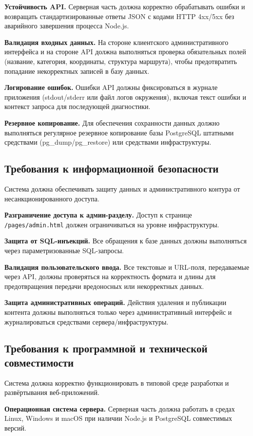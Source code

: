 \textbf{Устойчивость API.} Серверная часть должна корректно обрабатывать
ошибки и возвращать стандартизированные ответы JSON с кодами HTTP 4xx/5xx
без аварийного завершения процесса Node.js.

\textbf{Валидация входных данных.} На стороне клиентского административного
интерфейса и на стороне API должна выполняться проверка обязательных полей
(название, категория, координаты, структура маршрута), чтобы предотвратить
попадание некорректных записей в базу данных.

\textbf{Логирование ошибок.} Ошибки API должны фиксироваться в журнале
приложения (stdout/stderr или файл логов окружения), включая текст ошибки и
контекст запроса для последующей диагностики.

\textbf{Резервное копирование.} Для обеспечения сохранности данных должно
выполняться регулярное резервное копирование базы PostgreSQL штатными
средствами (pg\_dump/pg\_restore) или средствами инфраструктуры.

\subsection{Требования к информационной безопасности}
Система должна обеспечивать защиту данных и административного контура от
несанкционированного доступа.

\textbf{Разграничение доступа к админ-разделу.} Доступ к
странице \texttt{/pages/admin.html} должен ограничиваться на уровне
инфраструктуры.

\textbf{Защита от SQL-инъекций.} Все обращения к базе данных должны
выполняться через параметризованные SQL-запросы.

\textbf{Валидация пользовательского ввода.} Все текстовые и URL-поля,
передаваемые через API, должны проверяться на корректность формата и длины
для предотвращения передачи вредоносных или некорректных данных.

\textbf{Защита административных операций.} Действия удаления и публикации
контента должны выполняться только через административный интерфейс и
журналироваться средствами сервера/инфраструктуры.

\subsection{Требования к программной и технической совместимости}
Система должна корректно функционировать в типовой среде разработки и
развёртывания веб-приложений.

\textbf{Операционная система сервера.} Серверная часть должна работать в
средах Linux, Windows и macOS при наличии Node.js и PostgreSQL совместимых
версий.

